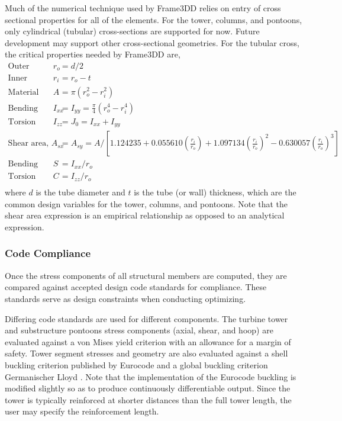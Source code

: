 Much of the numerical technique used by Frame3DD relies on entry of
cross sectional properties for all of the elements.  For the tower,
columns, and pontoons, only cylindrical (tubular) cross-sections are
supported for now.  Future development may support other cross-sectional
geometries.  For the tubular cross, the critical properties needed by
Frame3DD are,
\begin{align*}
  \textrm{Outer radius, } r_o &= d/2\\
  \textrm{Inner radius, } r_i &= r_o - t\\
  \textrm{Material area, } A &= \pi \left( r_o^2 - r_i^2 \right)\\
  \textrm{Bending second moment of area, } I_{xx} &= I_{yy} = \frac{\pi}{4}\left( r_o^4 - r_i^4 \right)\\
  \textrm{Torsion second moment of area, } I_{zz} &= J_0 = I_{xx} + I_{yy}\\
  \textrm{Shear area, } A_{sx} &= A_{sy} = A / \left[ 1.124235 +
           0.055610\left(\frac{r_i}{r_o}\right) +
           1.097134\left(\frac{r_i}{r_o}\right)^2 - 0.630057\left(\frac{r_i}{r_o}\right)^3 \right]\\
  \textrm{Bending modulus, } S &= I_{xx} / r_o \\
  \textrm{Torsion modulus (shear constant), } C &= I_{zz} / r_o \\
\end{align*}
where $d$ is the tube diameter and $t$ is the tube (or wall) thickness,
which are the common design variables for the tower, columns, and
pontoons. Note that the shear area expression is an empirical relationship as
opposed to an analytical expression.

\subsubsection{Code Compliance}
Once the stress components of all structural members are computed, they
are compared against accepted design code standards for compliance.
These standards serve as design constraints when conducting optimizing.

Differing code standards are used for different components.  The turbine
tower and substructure pontoons stress components (axial, shear, and
hoop) are evaluated against a von Mises yield criterion with an
allowance for a margin of safety.  Tower segment stresses and geometry
are also evaluated against a shell buckling criterion published by
Eurocode \citet{Eurocode} and a global buckling criterion Germanischer
Lloyd \citet{Germanischer}.  Note that the implementation of the
Eurocode buckling is modified slightly so as to produce continuously
differentiable output. Since the tower is typically reinforced at
shorter distances than the full tower length, the user may specify the
reinforcement length.

